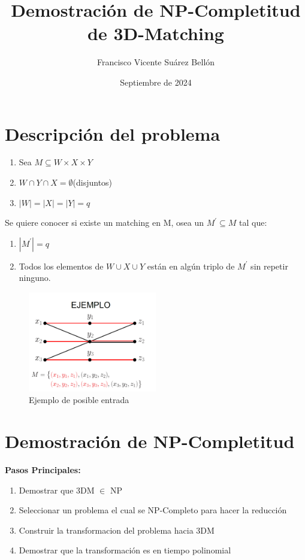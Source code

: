 \documentclass{article}
\title{Demostración de NP-Completitud de 3D-Matching}
\author{Francisco Vicente Suárez Bellón}
\date{Septiembre de 2024}
\begin{document}
\maketitle
\newpage
\tableofcontents %
\newpage

\section{Descripción del problema}
\begin{enumerate}
    \item Sea $M \subseteq  W \times  X \times Y$
    \item $W \cap Y \cap X = \emptyset $(disjuntos)
    \item $|W|=|X|=|Y|=q$
    
\end{enumerate}
Se quiere conocer si existe un matching en M, osea un $M^{'}\subseteq M$ tal que:
\begin{enumerate}
    \item $|M^{'}|=q$
    \item Todos los elementos de $W \cup X \cup Y$ están en algún triplo de $M^{'}$ sin repetir ninguno.
\end{enumerate}

\begin{figure}[H]
    \centering
    \includegraphics[width=0.5\textwidth]{photos/3_DM_example_1.png}
    \caption{Ejemplo de posible entrada}
    \label{fig:etiqueta}
\end{figure}


\newpage
\section{Demostración de NP-Completitud}
\textbf{Pasos Principales:}
\begin{enumerate}
    \item Demostrar que 3DM $\in$ NP
    \item Seleccionar un problema el cual se NP-Completo para hacer la reducción
    \item Construir la transformacion del problema hacia 3DM
    \item Demostrar que la transformación es en tiempo polinomial
\end{enumerate}
\newpage
\end{document}
